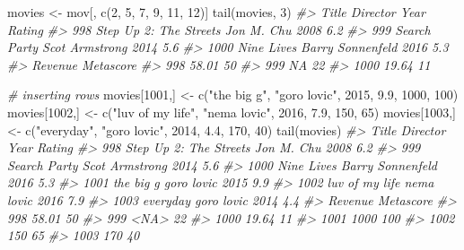 \documentclass[
]{book}
\newenvironment{Shaded}{\begin{snugshade}}{\end{snugshade}}
\newcommand{\CommentTok}[1]{\textcolor[rgb]{0.56,0.35,0.01}{\textit{#1}}}
\newcommand{\DecValTok}[1]{\textcolor[rgb]{0.00,0.00,0.81}{#1}}
\newcommand{\FloatTok}[1]{\textcolor[rgb]{0.00,0.00,0.81}{#1}}
\newcommand{\FunctionTok}[1]{\textcolor[rgb]{0.00,0.00,0.00}{#1}}
\newcommand{\NormalTok}[1]{#1}
\newcommand{\OtherTok}[1]{\textcolor[rgb]{0.56,0.35,0.01}{#1}}
\newcommand{\StringTok}[1]{\textcolor[rgb]{0.31,0.60,0.02}{#1}}
\begin{document}
\begin{Shaded}
\begin{Highlighting}[]
\NormalTok{movies }\OtherTok{\textless{}{-}}\NormalTok{ mov[, }\FunctionTok{c}\NormalTok{(}\DecValTok{2}\NormalTok{, }\DecValTok{5}\NormalTok{, }\DecValTok{7}\NormalTok{, }\DecValTok{9}\NormalTok{, }\DecValTok{11}\NormalTok{, }\DecValTok{12}\NormalTok{)]}
\FunctionTok{tail}\NormalTok{(movies, }\DecValTok{3}\NormalTok{)}
\CommentTok{\#\textgreater{}                       Title         Director Year Rating}
\CommentTok{\#\textgreater{} 998  Step Up 2: The Streets       Jon M. Chu 2008    6.2}
\CommentTok{\#\textgreater{} 999            Search Party   Scot Armstrong 2014    5.6}
\CommentTok{\#\textgreater{} 1000             Nine Lives Barry Sonnenfeld 2016    5.3}
\CommentTok{\#\textgreater{}      Revenue Metascore}
\CommentTok{\#\textgreater{} 998    58.01        50}
\CommentTok{\#\textgreater{} 999       NA        22}
\CommentTok{\#\textgreater{} 1000   19.64        11}

\CommentTok{\# inserting rows}
\NormalTok{movies[}\DecValTok{1001}\NormalTok{,] }\OtherTok{\textless{}{-}} \FunctionTok{c}\NormalTok{(}\StringTok{"the big g"}\NormalTok{, }\StringTok{"goro lovic"}\NormalTok{, }\DecValTok{2015}\NormalTok{, }\FloatTok{9.9}\NormalTok{, }\DecValTok{1000}\NormalTok{, }\DecValTok{100}\NormalTok{)}
\NormalTok{movies[}\DecValTok{1002}\NormalTok{,] }\OtherTok{\textless{}{-}} \FunctionTok{c}\NormalTok{(}\StringTok{"luv of my life"}\NormalTok{, }\StringTok{"nema lovic"}\NormalTok{, }\DecValTok{2016}\NormalTok{, }\FloatTok{7.9}\NormalTok{, }\DecValTok{150}\NormalTok{, }\DecValTok{65}\NormalTok{)}
\NormalTok{movies[}\DecValTok{1003}\NormalTok{,] }\OtherTok{\textless{}{-}} \FunctionTok{c}\NormalTok{(}\StringTok{"everyday"}\NormalTok{, }\StringTok{"goro lovic"}\NormalTok{, }\DecValTok{2014}\NormalTok{, }\FloatTok{4.4}\NormalTok{, }\DecValTok{170}\NormalTok{, }\DecValTok{40}\NormalTok{)}
\FunctionTok{tail}\NormalTok{(movies)}
\CommentTok{\#\textgreater{}                       Title         Director Year Rating}
\CommentTok{\#\textgreater{} 998  Step Up 2: The Streets       Jon M. Chu 2008    6.2}
\CommentTok{\#\textgreater{} 999            Search Party   Scot Armstrong 2014    5.6}
\CommentTok{\#\textgreater{} 1000             Nine Lives Barry Sonnenfeld 2016    5.3}
\CommentTok{\#\textgreater{} 1001              the big g       goro lovic 2015    9.9}
\CommentTok{\#\textgreater{} 1002         luv of my life       nema lovic 2016    7.9}
\CommentTok{\#\textgreater{} 1003               everyday       goro lovic 2014    4.4}
\CommentTok{\#\textgreater{}      Revenue Metascore}
\CommentTok{\#\textgreater{} 998    58.01        50}
\CommentTok{\#\textgreater{} 999     \textless{}NA\textgreater{}        22}
\CommentTok{\#\textgreater{} 1000   19.64        11}
\CommentTok{\#\textgreater{} 1001    1000       100}
\CommentTok{\#\textgreater{} 1002     150        65}
\CommentTok{\#\textgreater{} 1003     170        40}


\end{Highlighting}
\end{Shaded}
\end{document}
